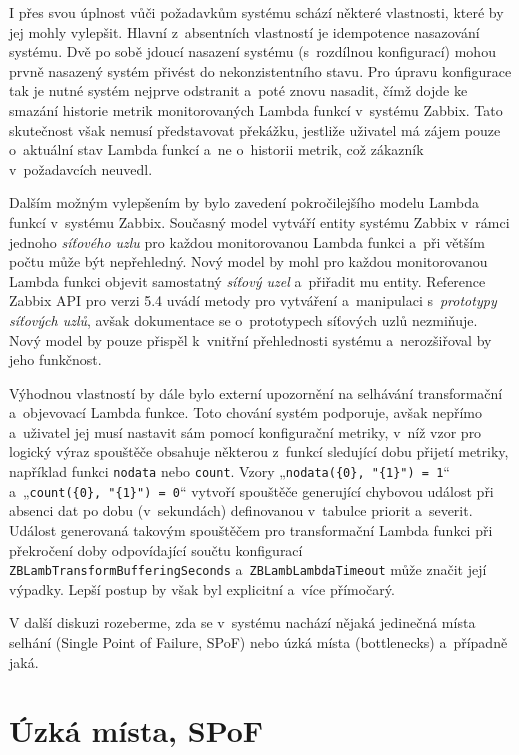 \documentclass[czech, ing, kiv, he, iso690]{fasthesis}
\begin{document}
I přes svou úplnost vůči požadavkům systému schází některé vlastnosti, které by jej mohly vylepšit. Hlavní z~absentních vlastností je idempotence nasazování systému. Dvě po sobě jdoucí nasazení systému (s~rozdílnou konfigurací) mohou prvně nasazený systém přivést do nekonzistentního stavu. Pro úpravu konfigurace tak je nutné systém nejprve odstranit a~poté znovu nasadit, čímž dojde ke smazání historie metrik monitorovaných Lambda funkcí v~systému Zabbix. Tato skutečnost však nemusí představovat překážku, jestliže uživatel má zájem pouze o~aktuální stav Lambda funkcí a~ne o~historii metrik, což zákazník v~požadavcích neuvedl.

Dalším možným vylepšením by bylo zavedení pokročilejšího modelu Lambda funkcí v~systému Zabbix. Současný model vytváří entity systému Zabbix v~rámci jednoho \emph{síťového uzlu} pro každou monitorovanou Lambda funkci a~při větším počtu může být nepřehledný. Nový model by mohl pro každou monitorovanou Lambda funkci objevit samostatný \emph{síťový uzel} a~přiřadit mu entity. Reference Zabbix API pro verzi 5.4 uvádí metody pro vytváření a~manipulaci s~\emph{prototypy síťových uzlů}, avšak dokumentace se o~prototypech síťových uzlů nezmiňuje. Nový model by pouze přispěl k~vnitřní přehlednosti systému a~nerozšiřoval by jeho funkčnost.

Výhodnou vlastností by dále bylo externí upozornění na selhávání transformační a~objevovací Lambda funkce. Toto chování systém podporuje, avšak nepřímo a~uživatel jej musí nastavit sám pomocí konfigurační metriky, v~níž vzor pro logický výraz spouštěče obsahuje některou z~funkcí sledující dobu přijetí metriky, například funkci \verb|nodata| nebo \verb|count|. Vzory „\verb|nodata({0}, "{1}") = 1|“ a~„\verb|count({0}, "{1}") = 0|“ vytvoří spouštěče generující chybovou událost při absenci dat po dobu (v~sekundách) definovanou v~tabulce priorit a~severit. Událost generovaná takovým spouštěčem pro transformační Lambda funkci při překročení doby odpovídající součtu konfigurací \verb|ZBLambTransformBufferingSeconds| a~\verb|ZBLambLambdaTimeout| může značit její výpadky. Lepší postup by však byl explicitní a~více přímočarý.

V další diskuzi rozeberme, zda se v~systému nachází nějaká jedinečná místa selhání (Single Point of Failure, SPoF) nebo úzká místa (bottlenecks) a~případně jaká.

\section{Úzká místa, SPoF}
\end{document}
